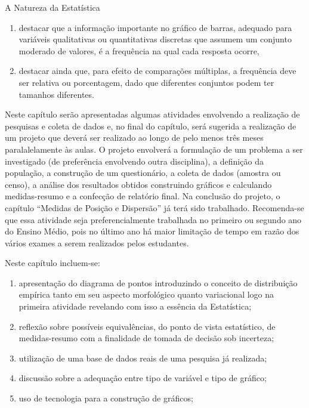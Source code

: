 \begin{apresentacao}{A Natureza da Estatística}
\begin{enumerate}
\item {} 
destacar que a informação importante no gráfico de barras, adequado para variáveis qualitativas ou quantitativas discretas que assumem um conjunto moderado de valores, é a frequência na qual cada resposta ocorre,

\item {} 
destacar ainda que, para efeito de comparações múltiplas, a frequência deve ser relativa ou porcentagem, dado que diferentes conjuntos podem ter tamanhos diferentes.

\end{enumerate}

Neste capítulo serão apresentadas algumas atividades envolvendo a realização de pesquisas e coleta de dados e, no final do capítulo, será sugerida a realização de um projeto que deverá ser realizado ao longo de pelo menos três meses paralalelamente às aulas. O projeto envolverá a formulação de um problema a ser investigado (de preferência envolvendo outra disciplina), a definição da população, a construção de um questionário, a coleta de dados (amostra ou censo), a análise dos resultados obtidos construindo gráficos e calculando medidas-resumo e a confecção de relatório final. Na conclusão do projeto, o capítulo “Medidas de Posição e Dispersão” já terá sido trabalhado. Recomenda-se que essa atividade seja preferencialmente trabalhada no primeiro ou segundo ano do Ensino Médio, pois no último ano há maior limitação de tempo em razão dos vários exames a serem realizados pelos estudantes.


Neste capítulo incluem-se:
\begin{enumerate}
\item {} 
apresentação do diagrama de pontos introduzindo o conceito de distribuição empírica tanto em seu aspecto morfológico quanto variacional logo na primeira atividade revelando com isso a essência da Estatística;

\item {} 
reflexão sobre possíveis equivalências, do ponto de vista estatístico, de medidas-resumo com a finalidade de tomada de decisão sob incerteza;

\item {} 
utilização de uma base de dados reais de uma pesquisa já realizada;

\item {} 
discussão sobre a adequação entre tipo de variável e tipo de gráfico;

\item {} 
uso de tecnologia para a construção de gráficos;


\end{enumerate}
\end{apresentacao}

